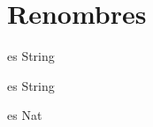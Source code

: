 \documentclass[10pt, a4paper]{article}
\begin{document}
\section{Renombres}
\begin{tad}{} es String
\end{tad}


\begin{tad}{} es String
\end{tad}

\begin{tad}{} es Nat
\end{tad}
\end{document}
